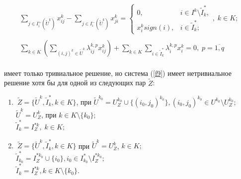 \documentclass[14pt]{extarticle}%
\begin{document}
\begin{equation}
\begin{gathered}
\sum_{j\in I^+_i(\widetilde U^k)} x^k_{ij}-\sum_{j\in I^-_i(\widetilde U^k)}x^k_{ji}=\left\{\begin{matrix}
0, & i\in I^k\setminus \widetilde I^*_k,\\ 
x^k_i sign(i), & i\in \widetilde I^*_k;
\end{matrix}\right.,\; k\in K;\\ \\
\sum_{k\in K}\left(\sum_{(i,j)^k\in\widetilde U^k}\lambda^{k,p}_{ij}x^k_{ij}\right)+\sum_{k\in K}\sum_{i\in\widetilde I^*_k}\lambda^{k,p}_ix^k_i=0,\; p=\overline{1,q} 
\end{gathered}\label{f9}
\end{equation}\\
имеет только тривиальное решение, но система (\ref{f9}) имеет нетривиальное решение хотя бы для одной из следующих пар $\widetilde Z$:
\begin{enumerate}
    \item 
    $\>\widetilde Z= \{\widetilde U^k,\widetilde I^*_k, k\in K\}$, при $\widetilde U^{k_0}=U^{k_0}_Z\cup \{(i_0, j_0)^{k_0}\}, (i_0, j_0)^{k_0}\in U^{k_0}\setminus U^{k_0}_Z;$\\
    $\widetilde U^k=U^k_Z$, при $k\in K\setminus \{k_0\};$\\
    $\widetilde I^*_k=I^{*k}_Z,\; k\in K;$
    \item $\>\widetilde Z= \{\widetilde U^k,\widetilde I^*_k, k\in K\}$ при $\widetilde U^k=U^k_Z$, $k\in K;$\\
    $\widetilde I^*_{k_0}=I^{*k_0}_Z\cup \{i_0\}, i_0\in I^*_{k_0}\setminus I^{*k_0}_Z;$\\
    $\widetilde I^*_{k}=I^{*k}_Z, k\in K\setminus\{k_0\}$.
\end{enumerate}
\end{document}
